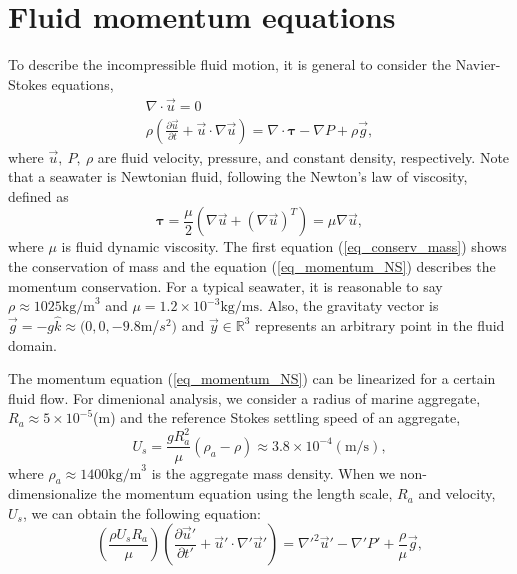 \section{Fluid momentum equations}
To describe the incompressible fluid motion, it is general to consider the Navier-Stokes equations,
\begin{align}
\nabla \cdot \vec{u} = 0 
\label{eq_conserv_mass} \\
\rho 
\left( 
   \frac{\partial \vec{u}}{\partial t} + \vec{u}\cdot \nabla \vec{u}
\right)
  = \nabla \cdot \boldsymbol{\tau} - \nabla P+ \rho  \vec{g} ,
\label{eq_momentum_NS}
\end{align}
where $\vec{u}, \ P, \ \rho$ are fluid velocity, pressure, and constant density, respectively. Note that a seawater is Newtonian fluid, following the Newton's law of viscosity, defined as
\begin{equation}
\boldsymbol{\tau} = \frac{\mu}{2} \left( \nabla \vec{u} + (\nabla  \vec{u})^T \right)  = \mu \nabla \vec{u},
\label{eq_newton_viscosity}
\end{equation}
where $\mu$ is fluid dynamic viscosity.
The first equation (\ref{eq_conserv_mass}) shows the conservation of mass and the equation (\ref{eq_momentum_NS}) describes the momentum conservation. 
For a typical seawater, it is reasonable to say $\rho \approx 1025 \text{kg/m}^3$ and $\mu = 1.2 \times 10^{-3}\text{kg}/\text{ms}$.
Also, the gravitaty vector is $\vec{g} = - g\hat{k} \approx (0,0,-9.8$m/$s^2)$ and $\vec{y} \in \mathbb{R}^3$ represents an arbitrary point in the fluid domain. 
\par
 The momentum equation (\ref{eq_momentum_NS}) can be linearized for a certain fluid flow. 
 For dimenional analysis, we consider a radius of marine aggregate, $R_a \approx 5 \times 10^{-5}$(m) and the reference Stokes settling speed of an aggregate,
\begin{equation}
    U_s =  \frac{gR_a^2}{\mu} (\rho_a-\rho) \approx 3.8 \times 10^{-4} ({\text{m/s}}),
	\label{eq_U_s}
\end{equation}
where $\rho_a \approx 1400\text{kg/m}^3$ is the aggregate mass density. 
When we non-dimensionalize the momentum equation using the length scale, $R_a$ and velocity, $U_s$, we can obtain the following equation:
\begin{equation}
	\left(\frac{\rho U_s R_a}{\mu} \right) 
   \left( 
   \frac{\partial \vec{u}'}{\partial t'} + \vec{u}'\cdot \nabla' \vec{u}'
\right)
 = {\nabla'}^2 \vec{u}' - \nabla' P' + \frac{\rho}{\mu}  \vec{g},
 \label{eq_NS_moment_noD}
\end{equation}

